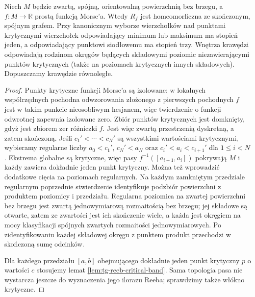 \begin{twierdzenie}
\label{thm:tg-reeb-finite}
Niech $M$ będzie zwartą, spójną, orientowalną
powierzchnią bez brzegu, a $f:M\to\mathbb R$
prostą funkcją Morse'a. Wtedy $R_f$ jest
homeomorficzna ze skończonym, spójnym grafem.
Przy kanonicznym wyborze wierzchołków nad punktami
krytycznymi wierzchołek odpowiadający minimum lub
maksimum ma stopień jeden, a odpowiadający punktowi
siodłowemu ma stopień trzy. Wnętrza krawędzi
odpowiadają rodzinom okręgów będących składowymi
poziomic niezawierającymi punktów krytycznych
(także na poziomach krytycznych innych składowych).
Dopuszczamy krawędzie równoległe.
\end{twierdzenie}

\begin{proof}
Punkty krytyczne funkcji Morse'a są izolowane:
w lokalnych współrzędnych pochodna odwzorowania
złożonego z pierwszych pochodnych $f$ jest w takim
punkcie nieosobliwym hesjanem, więc twierdzenie
o funkcji odwrotnej zapewnia izolowane zero.
Zbiór punktów krytycznych jest domknięty, gdyż jest zbiorem zer
różniczki $f$. Jest więc zwartą przestrzenią dyskretną,
a zatem skończoną.
Jeśli $c_1'<\cdots<c_N'$ są wszystkimi wartościami
krytycznymi, wybieramy regularne liczby $a_0<c_1'$,
$c_N'<a_N$ oraz $c_i'<a_i<c_{i+1}'$ dla $1\le i<N$.
Ekstrema globalne są krytyczne, więc pasy
$f^{-1}([a_{i-1},a_i])$ pokrywają $M$ i każdy zawiera
dokładnie jeden punkt krytyczny. Można też wprowadzić
dodatkowe cięcia na poziomach regularnych. Na każdym zamkniętym przedziale regularnym
poprzednie stwierdzenie identyfikuje podzbiór powierzchni
z produktem poziomicy i przedziału. Regularna poziomica
na zwartej powierzchni bez brzegu jest zwartą
jednowymiarową rozmaitością bez brzegu; jej składowe
są otwarte, zatem ze zwartości jest ich skończenie wiele,
a każda jest okręgiem na mocy klasyfikacji spójnych
zwartych rozmaitości jednowymiarowych. Po zidentyfikowaniu każdej składowej okręgu
z punktem produkt przechodzi w skończoną sumę odcinków.

Dla każdego przedziału $[a,b]$ obejmującego dokładnie jeden
punkt krytyczny $p$ o wartości $c$ stosujemy lemat
\ref{lem:tg-reeb-critical-band}. Sama topologia pasa
nie wystarcza jeszcze do wyznaczenia jego ilorazu
Reeba; sprawdzimy także włókno krytyczne.


\end{proof}

